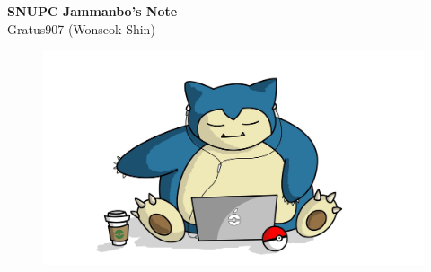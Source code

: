 \documentclass[landscape,8pt]{article}
\begin{document}
  \begin{center}
    \Huge{\textbf{SNUPC Jammanbo's Note}}\\
    \vspace{0.5em}
    \Large{Gratus907 (Wonseok Shin)}
    \vspace{-1.5em}
  \end{center}
  \begin{figure}[H]
  \includegraphics[width = \linewidth]{Jammanbo.jpg}
  \end{figure}
\end{document}
